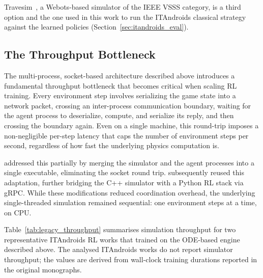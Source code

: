 Travesim~\cite{travesim}, a Webots-based simulator of the IEEE VSSS category, is a third option and the one used in this work to run the ITAndroids classical strategy
against the learned policies (Section~\ref{sec:itandroids_eval}).

\subsection{The Throughput Bottleneck}
\label{sec:throughput_bottleneck}

The multi-process, socket-based architecture described above introduces a
fundamental throughput bottleneck that becomes critical when scaling RL
training.  Every environment step involves serializing the game state into a
network packet, crossing an inter-process communication boundary, waiting for
the agent process to deserialize, compute, and serialize its reply, and then
crossing the boundary again.  Even on a single machine, this round-trip imposes
a non-negligible per-step latency that caps the number of environment steps per
second, regardless of how fast the underlying physics computation is.

\textcite{medeiros2020} addressed this partially by merging the simulator and
the agent processes into a single executable, eliminating the socket round
trip.  \textcite{master_thay} subsequently reused this adaptation, further
bridging the C++ simulator with a Python RL stack via gRPC.  While these
modifications reduced coordination overhead, the underlying single-threaded
simulation remained sequential: one environment steps at a time,
on CPU.

Table~\ref{tab:legacy_throughput} summarises simulation throughput for two
representative ITAndroids RL works that trained on the ODE-based engine
described above.  The analysed ITAndroids works do not report simulator throughput;
the values are derived from wall-clock training durations reported in the
original monographs.

